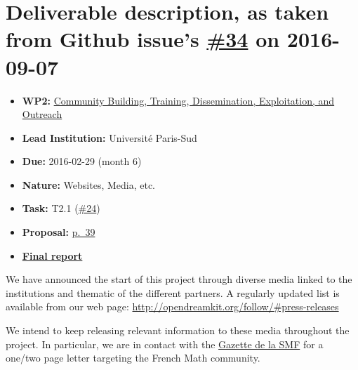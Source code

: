 \section*{\texorpdfstring{Deliverable description, as taken from Github
issue's
\href{https://github.com/OpenDreamKit/OpenDreamKit/issues/34}{\#34} on
2016-09-07}{Deliverable description, as taken from Github issue's \#34 on 2016-09-07}}\label{deliverable-description-as-taken-from-github-issues-34-on-2016-09-07}

\begin{itemize}
\tightlist
\item
  \textbf{WP2:}
  \href{https://github.com/OpenDreamKit/OpenDreamKit/tree/master/WP2}{Community
  Building, Training, Dissemination, Exploitation, and Outreach}
\item
  \textbf{Lead Institution:} Université Paris-Sud
\item
  \textbf{Due:} 2016-02-29 (month 6)
\item
  \textbf{Nature:} Websites, Media, etc.
\item
  \textbf{Task:} T2.1
  (\href{https://github.com/OpenDreamKit/OpenDreamKit/issues/24}{\#24})
\item
  \textbf{Proposal:}
  \href{https://github.com/OpenDreamKit/OpenDreamKit/raw/master/Proposal/proposal-www.pdf}{p.~39}
\item
  \textbf{\href{https://github.com/OpenDreamKit/OpenDreamKit/raw/master/WP2/D2.1/report-final.pdf}{Final
  report}}
\end{itemize}

We have announced the start of this project through diverse media linked
to the institutions and thematic of the different partners. A regularly
updated list is available from our web page:
\url{http://opendreamkit.org/follow/\#press-releases}

We intend to keep releasing relevant information to these media
throughout the project. In particular, we are in contact with the
\href{http://smf.emath.fr/}{Gazette de la SMF} for a one/two page letter
targeting the French Math community.
